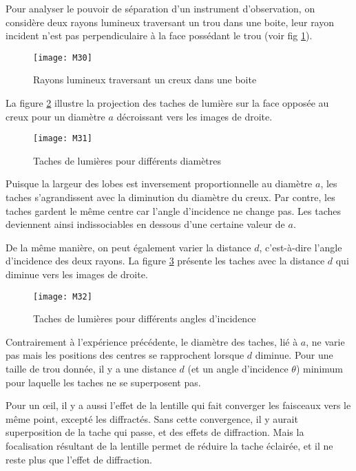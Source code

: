 \noindent Pour analyser le pouvoir de séparation d'un instrument d'observation, on considère deux rayons lumineux traversant un trou dans une boite, leur rayon incident n'est pas perpendiculaire à la face possédant le trou (voir fig \ref{d4}).

\begin{figure}[h]
    \centering
    \texttt{[image: M30]}
    \caption{Rayons lumineux traversant un creux dans une boite}
    \label{d4}
\end{figure}

\noindent La figure \ref{d6} illustre la projection des taches de lumière sur la face opposée au creux pour un diamètre $a$ décroissant vers les images de droite.

\begin{figure}[h]
    \centering
    \texttt{[image: M31]}
    \caption{Taches de lumières pour différents diamètres}
    \label{d6}
\end{figure}

\noindent Puisque la largeur des lobes est inversement proportionnelle au diamètre $a$, les taches s'agrandissent avec la diminution du diamètre du creux. Par contre, les taches gardent le même centre car l'angle d'incidence ne change pas.
Les taches deviennent ainsi indissociables en dessous d'une certaine valeur de $a$. 

\noindent De la même manière, on peut également varier la distance $d$, c'est-à-dire l'angle d'incidence des deux rayons. La figure \ref{d8} présente les taches avec la distance $d$ qui diminue vers les images de droite.

\begin{figure}[h]
    \centering
    \texttt{[image: M32]}
    \caption{Taches de lumières pour différents angles d'incidence}
    \label{d8}
\end{figure}

\noindent Contrairement à l'expérience précédente, le diamètre des taches, lié à $a$, ne varie pas mais les positions des centres se rapprochent lorsque $d$ diminue. Pour une taille de trou donnée, il y a une distance $d$ (et un angle d'incidence $\theta$) minimum pour laquelle les taches ne se superposent pas. 

\noindent Pour un œil, il y a aussi l’effet de la lentille qui fait converger les faisceaux vers le même point, excepté les diffractés. Sans cette convergence, il y aurait superposition de la tache qui passe, et des effets de diffraction. Mais la focalisation résultant de la lentille permet de réduire la tache éclairée, et il ne reste plus que l’effet de diffraction.

